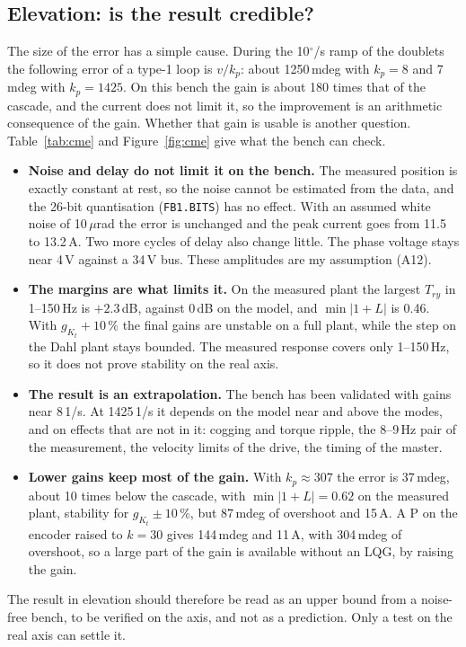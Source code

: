 \documentclass[10pt,a4paper]{article}
\numberwithin{equation}{section}
\begin{document}
\subsection{Elevation: is the result credible?}
The size of the error has a simple cause. During the 10$^\circ$/s ramp of the doublets the following error of a type-1 loop is $v/k_p$: about 1250\,mdeg with $k_p=8$ and 7\,mdeg with $k_p=1425$. On this bench the gain is about 180 times that of the cascade, and the current does not limit it, so the improvement is an arithmetic consequence of the gain. Whether that gain is usable is another question. Table~\ref{tab:cme} and Figure~\ref{fig:cme} give what the bench can check.
\begin{itemize}
\item \textbf{Noise and delay do not limit it on the bench.} The measured position is exactly constant at rest, so the noise cannot be estimated from the data, and the 26-bit quantisation (\texttt{FB1.BITS}) has no effect. With an assumed white noise of 10\,$\mu$rad the error is unchanged and the peak current goes from 11.5 to 13.2\,A. Two more cycles of delay also change little. The phase voltage stays near 4\,V against a 34\,V bus. These amplitudes are my assumption (A12).
\item \textbf{The margins are what limits it.} On the measured plant the largest $T_{ry}$ in 1--150\,Hz is $+2.3$\,dB, against 0\,dB on the model, and $\min|1+L|$ is 0.46. With $g_{K_t}+10$\,\% the final gains are unstable on a full plant, while the step on the Dahl plant stays bounded. The measured response covers only 1--150\,Hz, so it does not prove stability on the real axis.
\item \textbf{The result is an extrapolation.} The bench has been validated with gains near 8\,1/s. At 1425\,1/s it depends on the model near and above the modes, and on effects that are not in it: cogging and torque ripple, the 8--9\,Hz pair of the measurement, the velocity limits of the drive, the timing of the master.
\item \textbf{Lower gains keep most of the gain.} With $k_p\approx307$ the error is 37\,mdeg, about 10 times below the cascade, with $\min|1+L|=0.62$ on the measured plant, stability for $g_{K_t}\pm10$\,\%, but 87\,mdeg of overshoot and 15\,A. A P on the encoder raised to $k=30$ gives 144\,mdeg and 11\,A, with 304\,mdeg of overshoot, so a large part of the gain is available without an LQG, by raising the gain.
\end{itemize}
The result in elevation should therefore be read as an upper bound from a noise-free bench, to be verified on the axis, and not as a prediction. Only a test on the real axis can settle it.
\end{document}
